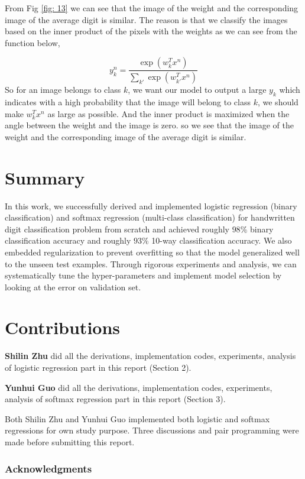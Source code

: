 \documentclass{article} %
\begin{document}
From Fig \ref{fig: 13} we can see that the image of the weight and the corresponding image of the average digit is similar. The reason is that we classify the images based on the inner product of the pixels with the weights as we can see from the function below,

\begin{equation}
y_k^n = \frac{\exp{( w_k^Tx^n)}}{ \sum_{k'}\exp{(w_{k'}^Tx^n)}}
\end{equation}
So for an image belongs to class $k$, we want our model to output a large $y_k$ which indicates with a high probability that the image will belong to class $k$, we should make $w_k^Tx^n$ as large as possible. And the inner product is maximized when the angle between the weight and the image is zero. so we see that the image of the weight and the corresponding image of the average digit is similar.


\section{Summary}
In this work, we successfully derived and implemented logistic regression (binary classification) and softmax regression (multi-class classification) for handwritten digit classification problem from scratch and achieved roughly $98\%$ binary classification accuracy and roughly $93\%$ 10-way classification accuracy. We also embedded regularization to prevent overfitting so that the model generalized well to the unseen test examples. Through rigorous experiments and analysis, we can systematically tune the hyper-parameters and implement model selection by looking at the error on validation set. 

\section{Contributions}
\textbf{Shilin Zhu} did all the derivations, implementation codes, experiments, analysis of logistic regression part in this report (Section 2). 

\textbf{Yunhui Guo} did all the derivations, implementation codes, experiments, analysis of softmax regression part in this report (Section 3). 

Both Shilin Zhu and Yunhui Guo implemented both logistic and softmax regressions for own study purpose. Three discussions and pair programming were made before submitting this report.

\subsubsection*{Acknowledgments}
\end{document}

